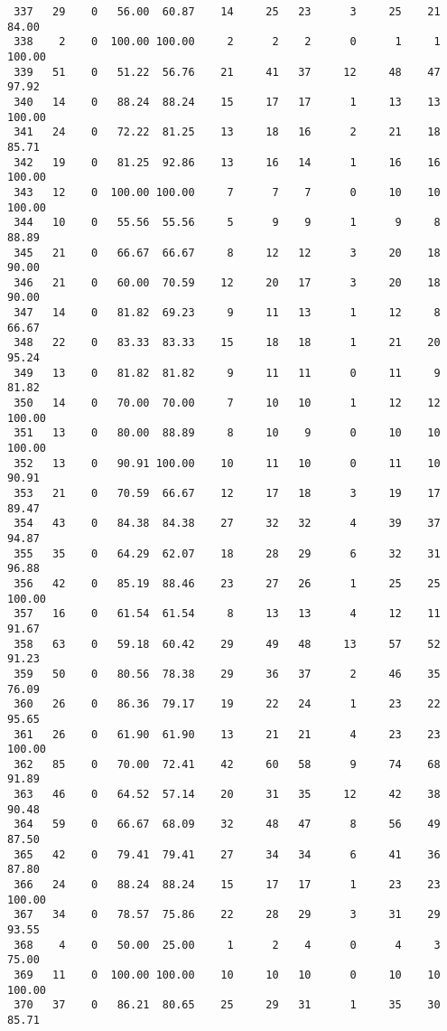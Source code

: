 \begin{verbatim}
 337   29    0   56.00  60.87    14     25   23      3     25    21    84.00
 338    2    0  100.00 100.00     2      2    2      0      1     1   100.00
 339   51    0   51.22  56.76    21     41   37     12     48    47    97.92
 340   14    0   88.24  88.24    15     17   17      1     13    13   100.00
 341   24    0   72.22  81.25    13     18   16      2     21    18    85.71
 342   19    0   81.25  92.86    13     16   14      1     16    16   100.00
 343   12    0  100.00 100.00     7      7    7      0     10    10   100.00
 344   10    0   55.56  55.56     5      9    9      1      9     8    88.89
 345   21    0   66.67  66.67     8     12   12      3     20    18    90.00
 346   21    0   60.00  70.59    12     20   17      3     20    18    90.00
 347   14    0   81.82  69.23     9     11   13      1     12     8    66.67
 348   22    0   83.33  83.33    15     18   18      1     21    20    95.24
 349   13    0   81.82  81.82     9     11   11      0     11     9    81.82
 350   14    0   70.00  70.00     7     10   10      1     12    12   100.00
 351   13    0   80.00  88.89     8     10    9      0     10    10   100.00
 352   13    0   90.91 100.00    10     11   10      0     11    10    90.91
 353   21    0   70.59  66.67    12     17   18      3     19    17    89.47
 354   43    0   84.38  84.38    27     32   32      4     39    37    94.87
 355   35    0   64.29  62.07    18     28   29      6     32    31    96.88
 356   42    0   85.19  88.46    23     27   26      1     25    25   100.00
 357   16    0   61.54  61.54     8     13   13      4     12    11    91.67
 358   63    0   59.18  60.42    29     49   48     13     57    52    91.23
 359   50    0   80.56  78.38    29     36   37      2     46    35    76.09
 360   26    0   86.36  79.17    19     22   24      1     23    22    95.65
 361   26    0   61.90  61.90    13     21   21      4     23    23   100.00
 362   85    0   70.00  72.41    42     60   58      9     74    68    91.89
 363   46    0   64.52  57.14    20     31   35     12     42    38    90.48
 364   59    0   66.67  68.09    32     48   47      8     56    49    87.50
 365   42    0   79.41  79.41    27     34   34      6     41    36    87.80
 366   24    0   88.24  88.24    15     17   17      1     23    23   100.00
 367   34    0   78.57  75.86    22     28   29      3     31    29    93.55
 368    4    0   50.00  25.00     1      2    4      0      4     3    75.00
 369   11    0  100.00 100.00    10     10   10      0     10    10   100.00
 370   37    0   86.21  80.65    25     29   31      1     35    30    85.71

\end{verbatim}

